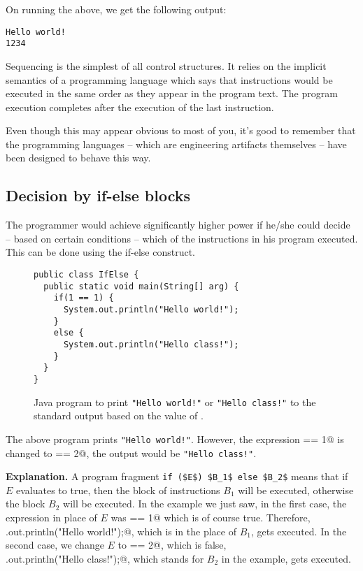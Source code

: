\documentclass[12pt,a4paper]{article}
\begin{document}
On running the above, we get the following output:
\begin{lstlisting}[frame=single]
Hello world!
1234
\end{lstlisting}

Sequencing is the simplest of all control structures. It relies on the implicit semantics of a programming language which says that instructions would be executed in the same order as they appear in the program text. The program execution completes after the execution of the last instruction.

Even though this may appear obvious to most of you, it's good to remember that the programming languages -- which are engineering artifacts themselves -- have been designed to behave this way.

\subsection{Decision by if-else blocks}
The programmer would achieve significantly higher power if he/she could decide -- based on certain conditions -- which of the instructions in his program executed. This can be done using the if-else construct.

\begin{figure}[H]
\begin{lstlisting}[frame=single]
public class IfElse {
  public static void main(String[] arg) {
    if(1 == 1) {
      System.out.println("Hello world!");
    }
    else {
      System.out.println("Hello class!");
    }
  }
}\end{lstlisting}
\caption{Java program to print \texttt{"Hello world!"} or \texttt{"Hello class!"} to the standard output based on the value of \lstinline@c@.}
\label{f:hw}
\end{figure}

The above program prints \texttt{"Hello world!"}. However, the expression  == 1@ is changed to  == 2@, the output would be \texttt{"Hello class!"}. 

\textbf{Explanation.} A program fragment \lstinline[mathescape]@if ($E$) $B_1$ else $B_2$@ means that if $E$ evaluates to true, then the block of instructions $B_1$ will be executed, otherwise the block $B_2$ will be executed. In the example we just saw, in the first case, the expression in place of $E$ was  == 1@ which is of course true. Therefore, \lstinline@System.out.println("Hello world!");@, which is in the place of $B_1$, gets executed. In the second case, we change $E$ to  == 2@, which is false, \\ 
\lstinline@System.out.println("Hello class!");@, which stands for $B_2$ in the example, gets executed.
\end{document}
